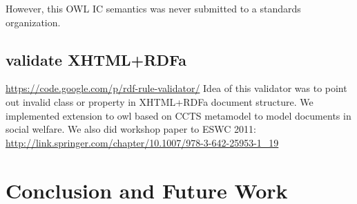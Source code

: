 \documentclass{llncs}
\begin{document}
However, this OWL IC semantics was never submitted to a standards organization.

\subsection{validate XHTML+RDFa}

\url{https://code.google.com/p/rdf-rule-validator/}
Idea of this validator was to point out invalid class or property in XHTML+RDFa document structure. We implemented extension to owl based on CCTS metamodel to model documents in social welfare. We also did workshop paper to ESWC 2011:
\url{http://link.springer.com/chapter/10.1007/978-3-642-25953-1_19}

\section{Conclusion and Future Work}



{}

\setcounter{tocdepth}{1}
\end{document}
